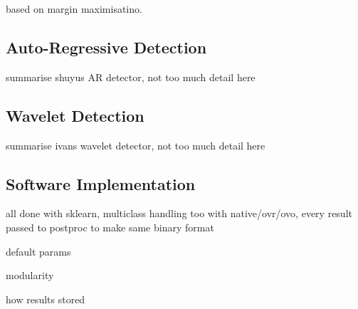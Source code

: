         
        
        
        
        based on margin maximisatino.

        
    
    
    \subsection{Auto-Regressive Detection}
    \label{subsec:pl-clf-ar}
        \begin{sitemize}
            \item{summarise shuyus AR detector, not too much detail here}
        \end{sitemize}
    
    \subsection{Wavelet Detection}
    \label{subsec:pl-clf-wavelet}
        \begin{sitemize}
            \item{summarise ivans wavelet detector, not too much detail here}
        \end{sitemize}

    \subsection{Software Implementation}
    \label{subsec:pl-clf-software}
        \begin{sitemize}
            \item{all done with sklearn, multiclass handling too with native/ovr/ovo, every result passed to postproc to make same binary format}
            \item{default params}
            \item{modularity}
            \item{how results stored}
        \end{sitemize}